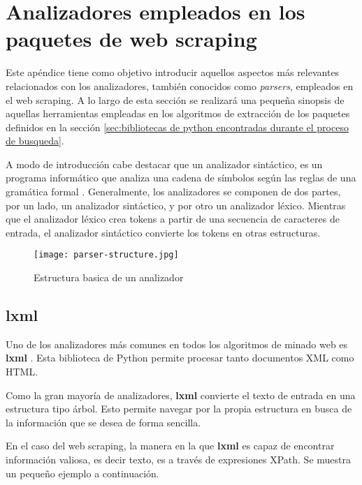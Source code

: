 \chapter{Analizadores empleados en los paquetes de web scraping}
\label{cha:analizadores empleados en los paquetes de web scraping}

Este apéndice tiene como objetivo introducir aquellos aspectos más relevantes relacionados con los
analizadores, también conocidos como \emph{parsers}, empleados en el web scraping. A lo largo de esta 
sección se realizará una pequeña sinopsis de aquellas herramientas empleadas en los algoritmos de extracción 
de los paquetes definidos en la sección \ref{sec:bibliotecas de python encontradas durante el proceso de 
busqueda}.

A modo de introducción cabe destacar que un analizador sintáctico, es un programa informático que analiza
una cadena de símbolos según las reglas de una gramática formal \cite{parser-lexer}. Generalmente, los 
analizadores se componen de dos partes, por un lado, un analizador sintáctico, y por otro un analizador 
léxico. Mientras que el analizador léxico crea tokens a partir de una secuencia de caracteres de entrada, 
el analizador sintáctico convierte los tokens en otras estructuras.

\begin{figure}[tphb]
    \centering
    \texttt{[image: parser-structure.jpg]}
    \caption{Estructura basica de un analizador}
    \label{img:estructura basica de un analizador}
\end{figure}

\section{lxml}
\label{sec:lxml}

Uno de los analizadores más comunes en todos los algoritmos de minado web es \textbf{lxml} \cite{lxml}. 
Esta biblioteca de Python permite procesar tanto documentos XML como HTML.

Como la gran mayoría de analizadores, \textbf{lxml} convierte el texto de entrada en una estructura tipo 
árbol. Esto permite navegar por la propia estructura en busca de la información que se desea de forma 
sencilla. 

En el caso del web scraping, la manera en la que \textbf{lxml} es capaz de encontrar información valiosa, 
es decir texto, es a través de expresiones XPath. Se muestra un pequeño ejemplo a continuación.

